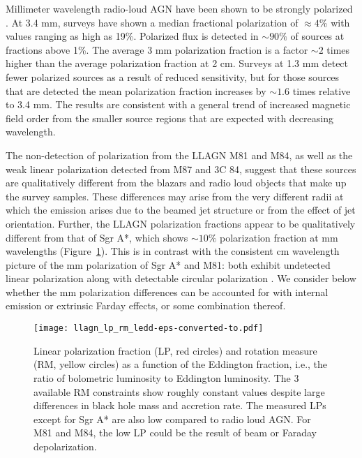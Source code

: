 \documentclass[12pt,preprint]{aastex}
\begin{document}
Millimeter wavelength radio-loud AGN have been shown to be strongly polarized
\citep{2010A&A...515A..40T,2014A&A...566A..59A}.  At 3.4 mm,
surveys have shown a median fractional polarization of $\approx 4$\%
with values ranging as high as 19\%. Polarized flux is detected in $\sim 90\%$ 
of sources at fractions above 1\%.   The average 3 mm polarization fraction is 
a factor $\sim 2$ times higher than the average polarization fraction at 2 cm.  
Surveys at 1.3 mm detect fewer 
polarized sources as a result of reduced sensitivity, but 
for those sources that are detected the mean polarization fraction increases
by $\sim 1.6$ times relative to 3.4 mm.  
The results are consistent with a general trend of increased magnetic
field order from the smaller source regions that are expected with
decreasing wavelength.

The non-detection of polarization from the LLAGN M81 and M84, as well as
the weak linear polarization detected from M87 and 3C 84, suggest that these sources
are qualitatively different from the blazars and radio
loud objects that make up the survey samples.  These differences may arise
from the very different radii at which the emission arises due to the beamed jet
structure or from the effect of jet orientation.  Further, the LLAGN
polarization fractions appear to be qualitatively different from that of 
Sgr A*, which shows $\sim 10\%$ polarization fraction at mm wavelengths
(Figure~\ref{fig:polfrac}).  This is in contrast with the consistent cm 
wavelength picture of the mm polarization of Sgr A* and M81:  both exhibit 
undetected linear polarization along with detectable circular polarization
\citep{2001ApJ...560L.123B}.  We consider below whether the mm polarization
differences can be accounted for with internal emission or extrinsic Farday effects, or
some combination thereof.

\begin{figure}[p!]
\texttt{[image: llagn\_lp\_rm\_ledd-eps-converted-to.pdf]}
\caption{Linear polarization fraction (LP, red circles) and rotation
  measure (RM, yellow circles) as a function of 
the Eddington fraction, i.e., 
the ratio of bolometric luminosity to Eddington luminosity.
The 3 available RM constraints show roughly constant values
  despite large differences in black hole mass and accretion rate. The
measured LPs except for Sgr A* are also low compared to radio loud
AGN. For M81 and M84, the low LP could be the result of beam or Faraday depolarization. 
\label{fig:polfrac}
}
\end{figure}
\end{document}
